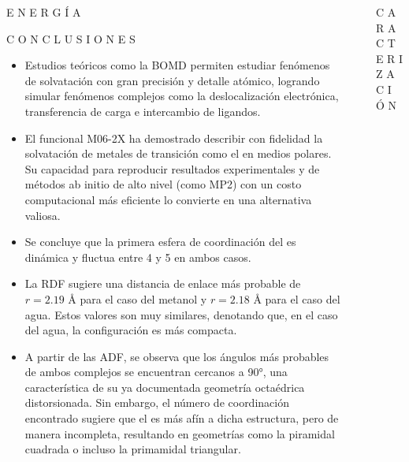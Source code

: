 \documentclass[final]{beamer}
\newlength{\sepwidth}
\newlength{\colwidth}
\newcommand{\separatorcolumn}{\begin{column}{\sepwidth}\end{column}}
\begin{document}
\begin{frame}[t]
\begin{columns}[t]
\begin{column}{\colwidth}
\begin{block}{E N E R G Í A}{}
			\end{block}
			
			\begin{exampleblock}{C O N C L U S I O N E S}{}
				\justifying
				
				\begin{itemize}
				\justifying

					\item Estudios teóricos como la BOMD permiten estudiar fenómenos de solvatación con gran precisión y detalle atómico, logrando simular fenómenos complejos como la deslocalización electrónica, transferencia de carga e intercambio de ligandos.
					\item El funcional M06-2X ha demostrado describir con fidelidad la solvatación de metales de transición como el  en medios polares. Su capacidad para reproducir resultados experimentales y de métodos ab initio de alto nivel (como MP2) con un costo computacional más eficiente lo convierte en una alternativa valiosa.
					\item Se concluye que la primera esfera de coordinación del  es dinámica y fluctua entre 4 y 5 en ambos casos.
					\item La RDF sugiere una distancia de enlace más probable de $r = 2.19 \text{ Å}$ para el caso del metanol y $r = 2.18 \text{ Å}$ para el caso del agua. Estos valores son muy similares, denotando que, en el caso del agua, la configuración es más compacta.
					\item A partir de las ADF, se observa que los ángulos más probables de ambos complejos se encuentran cercanos a 90°, una característica de su ya documentada geometría octaédrica distorsionada. Sin embargo, el número de coordinación encontrado sugiere que el  es más afín a dicha estructura, pero de manera incompleta, resultando en geometrías como la piramidal cuadrada o incluso la primamidal triangular.
				\end{itemize}


			\end{exampleblock}		

		\end{column}
	
		\separatorcolumn
		
		\begin{column}{\colwidth}
		
			\begin{block}{C A R A C T E R I Z A C I Ó N }{}
				

\end{block}
\end{column}
\end{columns}
\end{frame}
\end{document}
